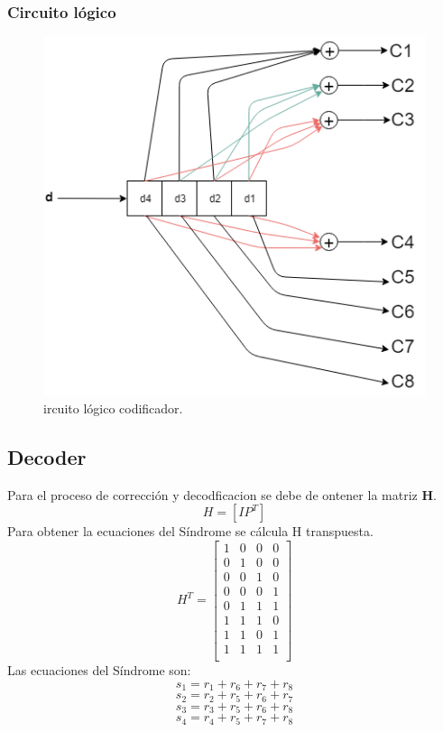 \documentclass[12pt,letterpaper]{article}
\begin{document}
\subsubsection{Circuito lógico}
\begin{figure}[ht]
    \centering
    \includegraphics[width=.8\textwidth]{ccode.png}
    \caption{ircuito lógico codificador.}
\end{figure}

\newpage
\subsection{Decoder}
Para el proceso de corrección y decodficacion se debe de ontener la matriz \textbf{H}.
\begin{equation}
    H=[I P^T]
\end{equation}
Para obtener la ecuaciones del Síndrome se cálcula H transpuesta.
\[
H^T
=
\begin{bmatrix} 
    1 & 0 & 0 & 0 \\
    0 & 1 & 0 & 0 \\
    0 & 0 & 1 & 0 \\
    0 & 0 & 0 & 1 \\
    0 & 1 & 1 & 1 \\
    1 & 1 & 1 & 0 \\
    1 & 1 & 0 & 1 \\
    1 & 1 & 1 & 1 \\
\end{bmatrix}
\]
Las ecuaciones del Síndrome son:
$$s_1=r_1+r_6+r_7+r_8$$
$$s_2=r_2+r_5+r_6+r_7$$
$$s_3=r_3+r_5+r_6+r_8$$
$$s_4=r_4+r_5+r_7+r_8$$
\end{document}
